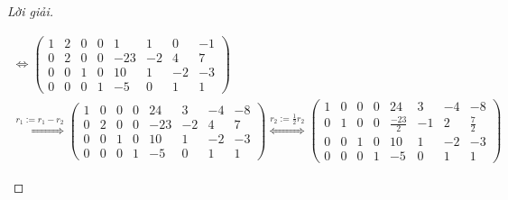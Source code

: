 \begin{proof}[Lời giải]
\begin{enumerate}[label = (\alph*)]
\begin{gather*}
{{                      }
                  }{\Longleftrightarrow}
                  \left(\begin{array}{cccc|cccc}
                          1 & 2 & 0 & 0 & 1   & 1  & 0  & -1 \\
                          0 & 2 & 0 & 0 & -23 & -2 & 4  & 7  \\
                          0 & 0 & 1 & 0 & 10  & 1  & -2 & -3 \\
                          0 & 0 & 0 & 1 & -5  & 0  & 1  & 1
                      \end{array}
                  \right) \\
                  \stackrel{
                      r_{1}:= r_{1} {-} r_{2}
                  }{\Longleftrightarrow}
                  \left(\begin{array}{cccc|cccc}
                          1 & 0 & 0 & 0 & 24  & 3  & -4 & -8 \\
                          0 & 2 & 0 & 0 & -23 & -2 & 4  & 7  \\
                          0 & 0 & 1 & 0 & 10  & 1  & -2 & -3 \\
                          0 & 0 & 0 & 1 & -5  & 0  & 1  & 1
                      \end{array}
                  \right)
                  \stackrel{
                  r_{2}:= \frac{1}{2}r_{2}
                  }{\Longleftrightarrow}
                  \left(\begin{array}{cccc|cccc}
                          1 & 0 & 0 & 0 & 24            & 3  & -4 & -8          \\
                          0 & 1 & 0 & 0 & \frac{-23}{2} & -1 & 2  & \frac{7}{2} \\
                          0 & 0 & 1 & 0 & 10            & 1  & -2 & -3          \\
                          0 & 0 & 0 & 1 & -5            & 0  & 1  & 1
                      \end{array}
                  \right)
              \end{gather*}
              

\end{enumerate}
\end{proof}
